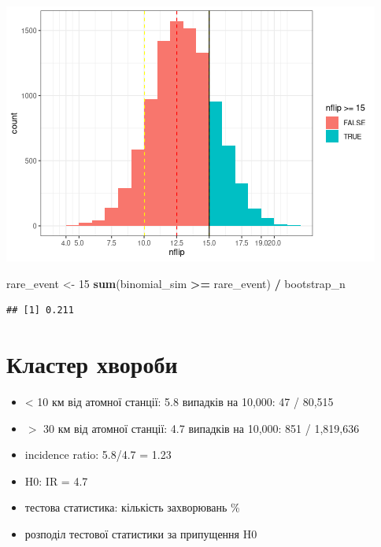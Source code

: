 \documentclass[
  10pt,
]{article}
\newenvironment{Shaded}{\begin{snugshade}}{\end{snugshade}}
\newcommand{\DecValTok}[1]{\textcolor[rgb]{0.00,0.00,0.81}{#1}}
\newcommand{\FunctionTok}[1]{\textcolor[rgb]{0.13,0.29,0.53}{\textbf{#1}}}
\newcommand{\NormalTok}[1]{#1}
\newcommand{\OtherTok}[1]{\textcolor[rgb]{0.56,0.35,0.01}{#1}}
\newcommand{\SpecialCharTok}[1]{\textcolor[rgb]{0.81,0.36,0.00}{\textbf{#1}}}
\begin{document}
\includegraphics{05.pvalues_files/figure-latex/unnamed-chunk-6-1.png}

\begin{Shaded}
\begin{Highlighting}[]
\NormalTok{rare\_event }\OtherTok{\textless{}{-}} \DecValTok{15}
\FunctionTok{sum}\NormalTok{(binomial\_sim }\SpecialCharTok{\textgreater{}=}\NormalTok{ rare\_event) }\SpecialCharTok{/}\NormalTok{ bootstrap\_n}
\end{Highlighting}
\end{Shaded}

\begin{verbatim}
## [1] 0.211
\end{verbatim}

\newpage

\hypertarget{ux43aux43bux430ux441ux442ux435ux440-ux445ux432ux43eux440ux43eux431ux438}{%
\section{Кластер
хвороби}\label{ux43aux43bux430ux441ux442ux435ux440-ux445ux432ux43eux440ux43eux431ux438}}

\begin{itemize}
\item
  \textless{} 10 км від атомної станції: 5.8 випадків на 10,000: 47 /
  80,515
\item
  \(>\) 30 км від атомної станції: 4.7 випадків на 10,000: 851 /
  1,819,636
\item
  incidence ratio: 5.8/4.7 = 1.23
\item
  H0: IR = 4.7
\item
  тестова статистика: кількість захворювань \%
\item
  розподіл тестової статистики за припущення H0
\end{itemize}
\end{document}
